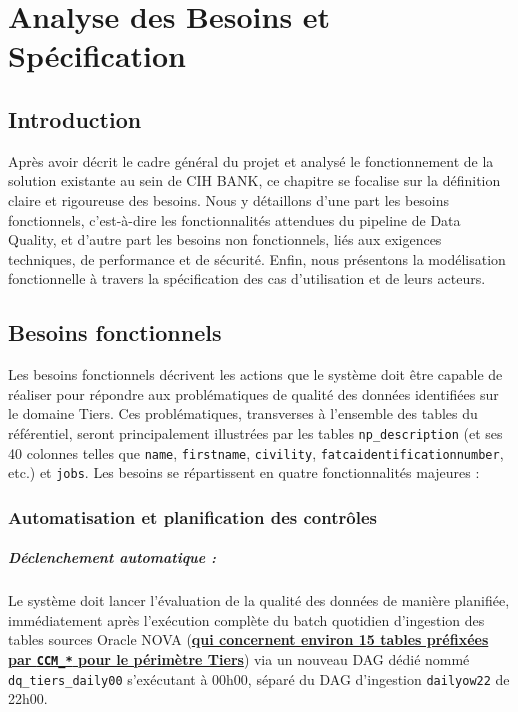 \chapter{Analyse des Besoins et Spécification}

\section*{Introduction}
Après avoir décrit le cadre général du projet et analysé le fonctionnement de la solution existante au sein de CIH BANK, ce chapitre se focalise sur la définition claire et rigoureuse des besoins. Nous y détaillons d'une part les besoins fonctionnels, c'est-à-dire les fonctionnalités attendues du pipeline de Data Quality, et d'autre part les besoins non fonctionnels, liés aux exigences techniques, de performance et de sécurité. Enfin, nous présentons la modélisation fonctionnelle à travers la spécification des cas d'utilisation et de leurs acteurs.

\section{Besoins fonctionnels}

Les besoins fonctionnels décrivent les actions que le système doit être capable de réaliser pour répondre aux problématiques de qualité des données identifiées sur le domaine Tiers. Ces problématiques, transverses à l'ensemble des tables du référentiel, seront principalement illustrées par les tables \texttt{np\_description} (et ses 40 colonnes telles que \texttt{name}, \texttt{firstname}, \texttt{civility}, \texttt{fatcaidentificationnumber}, etc.) et \texttt{jobs}. Les besoins se répartissent en quatre fonctionnalités majeures :

\subsection{Automatisation et planification des contrôles}
\paragraph{Déclenchement automatique :} Le système doit lancer l'évaluation de la qualité des données de manière planifiée, immédiatement après l'exécution complète du batch quotidien d'ingestion des tables sources Oracle NOVA (\textbf{\uline{qui concernent environ 15 tables préfixées par \texttt{CCM\_*} pour le périmètre Tiers}}) via un nouveau DAG dédié nommé \texttt{dq\_tiers\_daily00} s'exécutant à 00h00, séparé du DAG d'ingestion \texttt{dailyow22} de 22h00.

